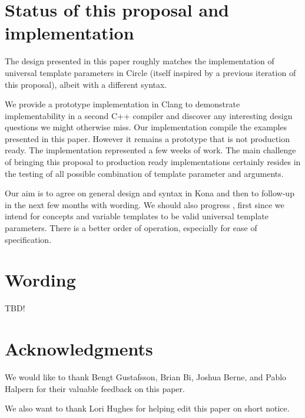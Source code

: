 \documentclass{wg21}
\begin{document}
\section{Status of this proposal and implementation}

The design presented in this paper roughly matches the implementation of universal template parameters in Circle (itself inspired by a previous iteration of this proposal),
albeit with a different syntax.

We provide a prototype implementation in Clang to demonstrate implementability in a second C++ compiler and discover any interesting design questions we might otherwise
miss. Our implementation compile the examples presented in this paper. However it remains a prototype that is not production ready.
The implementation represented a few weeks of work. The main challenge of bringing this proposal to production ready implementations certainly resides in the
testing of all possible combination of template parameter and arguments.


Our aim is to agree on general design and syntax in Kona and then to follow-up in the next few months with wording.
We should also progress , first since we intend for concepts and variable templates to be valid universal template parameters.
There is a better order of operation, especially for ease of specification.

\section{Wording}

TBD!

\section{Acknowledgments}

We would like to thank Bengt Gustafsson, Brian Bi, Joshua Berne, and Pablo Halpern for their
valuable feedback on this paper.


We also want to thank Lori Hughes for helping edit this paper on short notice.





\renewcommand{\section}[2]{}%

\begin{thebibliography}{9}


\end{thebibliography}
\end{document}
